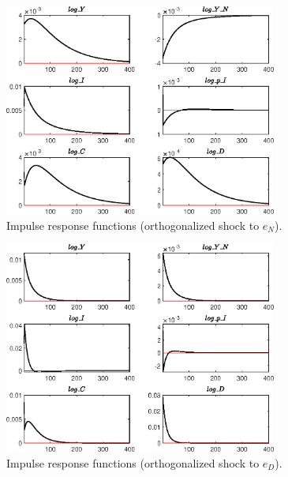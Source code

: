 \begin{figure}[H]
\centering 
\includegraphics[width=0.80\textwidth]{BRS_fd/graphs/BRS_fd_IRF_e_N}
\caption{Impulse response functions (orthogonalized shock to ${e_N}$).}
\label{Fig:IRF:e_N}
\end{figure}
 
\begin{figure}[H]
\centering 
\includegraphics[width=0.80\textwidth]{BRS_fd/graphs/BRS_fd_IRF_e_D}
\caption{Impulse response functions (orthogonalized shock to ${e_D}$).}
\label{Fig:IRF:e_D}
\end{figure}
 
 
